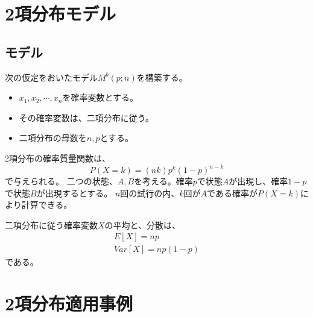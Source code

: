 \chapter{2項分布モデル}
\section{モデル}
次の仮定をおいたモデル$M^b(p; n)$を構築する。
\begin{itemize}
 \item $x_1,x_2,\cdots,x_n$を確率変数とする。
 \item その確率変数は、二項分布に従う。
 \item 二項分布の母数を$n,p$とする。
\end{itemize}
2項分布の確率質量関数は、
\begin{equation*}
 P(X=k) = (n k)p^k(1-p)^{n-k}
\end{equation*}
で与えられる。
二つの状態、$A,B$を考える。確率$p$で状態$A$が出現し、確率$1-p$で状態$B$が出現するとする。
$n$回の試行の内、$k$回が$A$である確率が$P(X=k)$により計算できる。

二項分布に従う確率変数$X$の平均と、分散は、
\begin{eqnarray}
 E[X]= np \\
 Var[X] = np(1-p)
\end{eqnarray}
である。



\chapter{2項分布適用事例}
